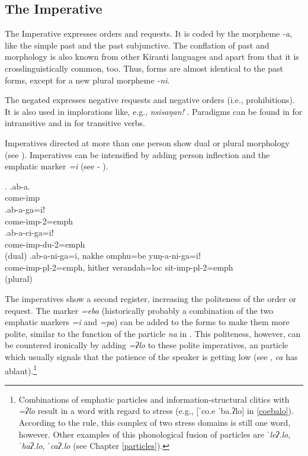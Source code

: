 \subsection{The Imperative}

The Imperative expresses orders and requests. It is coded by the morpheme \emph{-a}, like the simple past and the past subjunctive. The conflation of past and  morphology is also known from other Kiranti languages \citep{Bickel2003Belhare, Ebert2003Camling} and apart from that it is crosslinguistically common, too. Thus,  forms are almost identical to the past forms, except for a new plural morpheme \emph{-ni}. 

The negated  expresses negative requests and negative orders (i.e., prohibitions). It is also used in implorations like, e.g., \emph{nsisaŋan!} . Paradigms can be found in  for intransitive and in  for transitive verbs.
 
Imperatives directed at more than one person show dual or plural morphology (see \Next).  Imperatives can be intensified by adding person inflection and the emphatic marker \emph{=i} (see \Next[b] - \Next[d]). 
 
 \ex. \ag.ab-a.\\
 come{\sc -imp}\\
 \bg.ab-a-ga=iǃ\\
come{\sc -imp-2=emph}\\
 \bg.ab-a-ci-ga=iǃ\\
come{\sc -imp-du-2=emph}\\
  (dual)
 \bg.ab-a-ni-ga=i, nakhe omphu=be yuŋ-a-ni-ga=iǃ\\
come{\sc -imp-pl-2=emph}, hither verandah{\sc =loc} sit{\sc -imp-pl-2=emph}\\
  (plural)
 
\largerpage[-1] 
The imperatives show a second register, increasing the  politeness of the order or request. The marker \emph{=eba} (historically probably a combination of the two  emphatic markers  \emph{=i} and \emph{=pa}) can be added to the  forms to make them more polite, similar to the function of the  particle \emph{na} in   \Next. This politeness, however, can be countered ironically by adding \emph{=ʔlo} to these polite imperatives, an  particle which usually signals that  the patience of the speaker is getting low (see \Next[c], \emph{ca} has ablaut).\footnote{Combinations of emphatic particles and information-structural clitics with \emph{=ʔlo} result in a word with regard to stress (e.g., [ˈco.e ˈba.ʔlo] in \ref{coebalo}). According to the  rule,  this complex of two stress domains is still one word, however. Other examples of this phonological fusion of particles are \emph{ˈleʔ.lo}, \emph{ˈhaʔ.lo}, \emph{ˈcaʔ.lo} (see Chapter \ref{particles}).}

